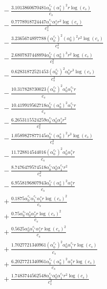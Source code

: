 \documentclass[10pt]{article}
\begin{document}
\begin{align*}
&{}  - \frac{3.1013860670481 \alpha_{0}^{c_s} \left(\alpha_{1}^s\right)^{2} r \log{\left(c_{s} \right)}}{c_{s}} \\
&{}  - \frac{0.7778918724447 \alpha_{1}^{c_s} \alpha_{1}^s r^{2} \log{\left(c_{s} \right)}}{c_{s}^{2}} \\
&{}  - \frac{3.2365674897788 \left(\alpha_{0}^{c_s}\right)^{2} \left(\alpha_{0}^s\right)^{2} r^{2} \log{\left(c_{s} \right)}}{c_{s}^{2}} \\
&{}  - \frac{2.6807837448894 \alpha_{0}^{c_s} \left(\alpha_{0}^s\right)^{3} r^{2} \log{\left(c_{s} \right)}}{c_{s}^{2}} \\
&{}  - \frac{0.62831872521453 \left(\alpha_{0}^{c_s}\right)^{2} \alpha_{0}^s r^{3} \log{\left(c_{s} \right)}}{c_{s}^{3}} \\
&{}  - \frac{10.317828730023 \left(\alpha_{0}^{c_s}\right)^{2} \alpha_{0}^s \alpha_{1}^{c_s} r}{c_{s}} \\
&{}  - \frac{10.419919562718 \alpha_{0}^{c_s} \left(\alpha_{0}^s\right)^{2} \alpha_{1}^{c_s} r}{c_{s}} \\
&{}  - \frac{6.2653115524259 \alpha_{0}^{c_s} \alpha_{0}^s \alpha_{1}^s r^{2}}{c_{s}^{2}} \\
&{}  - \frac{1.0589827877145 \alpha_{0}^{c_s} \left(\alpha_{0}^s\right)^{2} r^{3} \log{\left(c_{s} \right)}}{c_{s}^{3}} \\
&{}  - \frac{11.728814544016 \left(\alpha_{0}^{c_s}\right)^{2} \alpha_{0}^s \alpha_{1}^s r}{c_{s}} \\
&{}  - \frac{8.7476479574518 \alpha_{0}^{c_s} \alpha_{0}^s \alpha_{1}^{c_s} r^{2}}{c_{s}^{2}} \\
&{}  - \frac{6.9558196807943 \alpha_{0}^{c_s} \left(\alpha_{0}^s\right)^{2} \alpha_{1}^s r}{c_{s}} \\
&{}  + \frac{0.1875 \alpha_{0}^{c_s} \alpha_{1}^{c_s} \alpha_{1}^s r \log{\left(c_{s} \right)}^{2}}{c_{s}} \\
&{}  + \frac{0.75 \alpha_{0}^{c_s} \alpha_{0}^s \alpha_{2}^s r \log{\left(c_{s} \right)}^{2}}{c_{s}} \\
&{}  + \frac{0.5625 \alpha_{0}^s \alpha_{1}^{c_s} \alpha_{1}^s r \log{\left(c_{s} \right)}^{2}}{c_{s}} \\
&{}  + \frac{1.7027721340961 \left(\alpha_{0}^{c_s}\right)^{2} \alpha_{0}^s \alpha_{1}^{c_s} r \log{\left(c_{s} \right)}}{c_{s}} \\
&{}  + \frac{6.2027721340961 \alpha_{0}^{c_s} \left(\alpha_{0}^s\right)^{2} \alpha_{1}^s r \log{\left(c_{s} \right)}}{c_{s}} \\
&{}  + \frac{1.7483744562548 \alpha_{0}^{c_s} \alpha_{0}^s \alpha_{1}^{c_s} r^{2} \log{\left(c_{s} \right)}}{c_{s}^{2}} \\

\end{align*}
\end{document}
